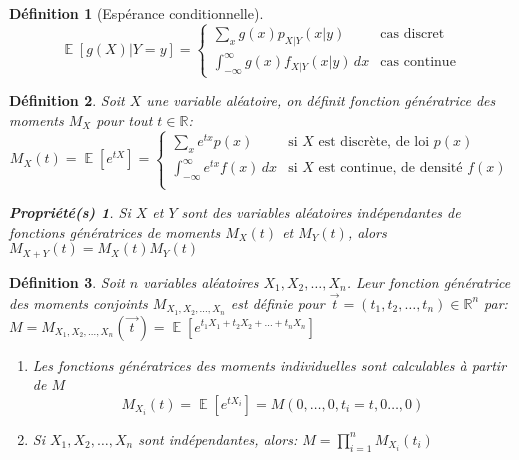 \documentclass{article}
\newtheorem*{mydef}{Définition}
\newtheorem*{prop}{Propriété(s)}
\newtheorem*{remark}{Remarque}
\DeclareMathOperator{\espo}{\mathbb{E}}
\newcommand{\esp}[1]{\espo\left[ #1\right] }
\begin{document}
	\begin{mydef}[Espérance conditionnelle]
	\begin{equation*}
		\esp{g(X)|Y=y}=%
		\begin{cases}
			\sum_{x}g(x)p_{X|Y}(x|y)&\text{cas discret}\\
			\int_{-\infty}^{\infty}g(x)f_{X|Y}(x|y)\,dx& \text{cas continue}
		\end{cases}
	\end{equation*}
	\end{mydef}
	\begin{mydef}
		Soit \(X\) une variable aléatoire, on définit fonction génératrice des moments \(M_X\) pour tout \(t\in\mathbb{R}\):
		\begin{equation*}
		M_X(t)=\esp{e^{tX}}=\begin{cases}
			\sum_{x}e^{tx}p(x)&\text{si $X$ est discrète, de loi $p(x)$}\\
			\int_{-\infty}^{\infty}e^{tx}f(x)\,dx&\text{si $X$ est continue, de densité $f(x)$}\\
		\end{cases} 
		\end{equation*}
		\begin{prop}
			Si \(X\) et \(Y\) sont des variables aléatoires indépendantes de fonctions génératrices de moments \(M_X(t)\) et \(M_Y(t)\), alors \(M_{X+Y}(t)=M_X(t)M_Y(t)\)
		\end{prop}
	\end{mydef}
	\begin{mydef}
		Soit \(n\) variables aléatoires \(X_1, X_2, \ldots, X_n\). Leur fonction génératrice des moments conjoints \(M_{X_1, X_2, \ldots, X_n}\) est définie pour \(\vec{t}=(t_1, t_2,\ldots, t_n)\in\mathbb{R}^n\) par: \(M=M_{X_1, X_2, \ldots, X_n}(\vec{~t~})=\esp{e^{t_1X_1+t_2X_2+\ldots+t_nX_n}}\)
			\begin{enumerate}
				\item Les fonctions génératrices des moments individuelles sont calculables à partir de \(M\)
					\begin{equation*}
						M_{X_i}(t)=\esp{e^{tX_i}}=M(0,\ldots,0,t_i=t,0\ldots,0)
					\end{equation*}
				\item Si \(X_1, X_2, \ldots, X_n\) sont indépendantes, alors: \(M=\prod_{i=1}^n M_{X_i}(t_i)\)
			\end{enumerate}
	\end{mydef}
\end{document}
